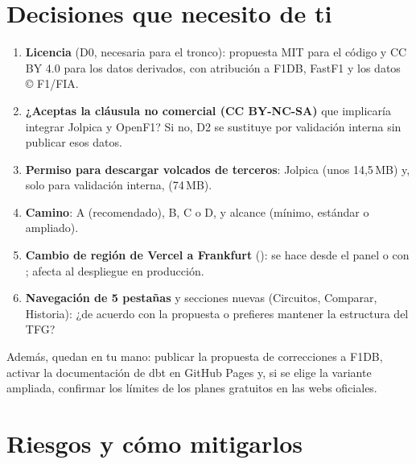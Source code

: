 \documentclass[11pt,openany]{report}
\begin{document}
\section{Decisiones que necesito de ti}\label{sec:decisiones}

\begin{enumerate}
  \item \textbf{Licencia} (D0, necesaria para el tronco): propuesta MIT para el código y CC BY 4.0
  para los datos derivados, con atribución a F1DB, FastF1 y los datos © F1/FIA.
  \item \textbf{¿Aceptas la cláusula no comercial (CC BY-NC-SA)} que implicaría integrar Jolpica y
  OpenF1? Si no, D2 se sustituye por validación interna sin publicar esos datos.
  \item \textbf{Permiso para descargar volcados de terceros}: Jolpica (unos 14,5\,MB) y, solo para
  validación interna,  (74\,MB).
  \item \textbf{Camino}: A (recomendado), B, C o D, y alcance (mínimo, estándar o ampliado).
  \item \textbf{Cambio de región de Vercel a Frankfurt} (): se hace desde el panel o con
  ; afecta al despliegue en producción.
  \item \textbf{Navegación de 5 pestañas} y secciones nuevas (Circuitos, Comparar, Historia): ¿de
  acuerdo con la propuesta o prefieres mantener la estructura del TFG?
\end{enumerate}

\noindent Además, quedan en tu mano: publicar la propuesta de correcciones a F1DB, activar la
documentación de dbt en GitHub Pages y, si se elige la variante ampliada, confirmar los límites de
los planes gratuitos en las webs oficiales.

\section{Riesgos y cómo mitigarlos}
\end{document}
